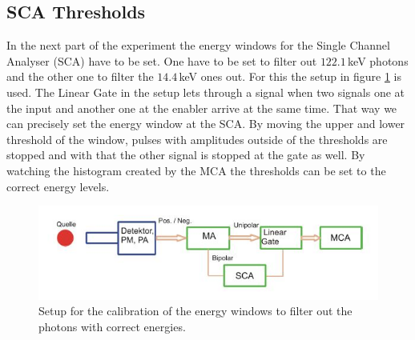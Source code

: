 \documentclass[30pt,a4paper]{article}
\begin{document}
 	\subsection{SCA Thresholds}
 	In the next part of the experiment the energy windows for the Single Channel Analyser (SCA) have to be set. One have to be set to filter out $122.1$\,keV photons and the other one to filter the $14.4$\,keV ones out. For this the setup in figure \ref{setup_EW} is used. The Linear Gate in the setup lets through a signal when two signals one at the input and another one at the enabler arrive at the same time. That way we can precisely set the energy window at the SCA. By moving the upper and lower threshold of the window, pulses with amplitudes outside of the thresholds are stopped and with that the other signal is stopped at the gate as well. By watching the histogram created by the MCA the thresholds can be set to the correct energy levels. \cite{Anleitung}
 	\begin{figure}[h]
 		\includegraphics{Bilder/Circuit_ES_calib}
 		\centering
 		\caption[Energy Spectrum Setup]{\small Setup for the calibration of the energy windows to filter out the photons with correct energies. \cite{Anleitung}}
 		\label{setup_EW}
 	\end{figure}\\
 	\FloatBarrier
\end{document}
